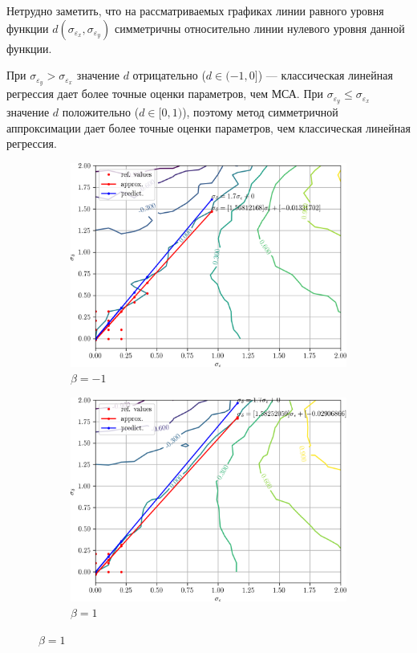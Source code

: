 Нетрудно заметить, что на рассматриваемых графиках линии равного уровня функции
\( d(\sigma_{\varepsilon_x}, \sigma_{\varepsilon_y}) \)
симметричны относительно линии нулевого уровня данной функции.

При \( \sigma_{\varepsilon_y} > \sigma_{\varepsilon_x} \)
значение \( d \) отрицательно (\( d \in ( -1, 0 ] \)) ---
классическая линейная регрессия дает более точные оценки параметров, чем МСА.
При \( \sigma_{\varepsilon_y} \le \sigma_{\varepsilon_x} \)
значение \( d \) положительно (\( d \in [0, 1 ) \)),
поэтому метод симметричной аппроксимации дает более точные оценки параметров,
чем классическая линейная регрессия.

\begin{figure}[p]
  \begin{subfigure}[b]{\linewidth}
    \centering
    \includegraphics[width=135mm]{fig/linear/param/beta--1_param-accs-diff-approx}
    \caption{\( \beta = -1 \)}\label{fig:comparison_linear_params_beta--1}
  \end{subfigure}

  \vspace{2\baselineskip}
  \begin{subfigure}[b]{\linewidth}
    \centering
    \includegraphics[width=135mm]{fig/linear/param/beta-1_param-accs-diff-approx}
    \caption{\( \beta = 1 \)}\label{fig:comparison_linear_params_beta-1}
  \end{subfigure}


\end{figure}
